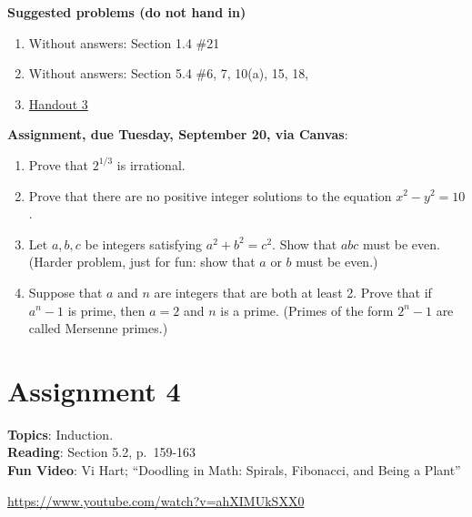 \documentclass[12pt]{article}
\begin{document}
\noindent \textbf{Suggested problems (do not hand in)}

\begin{enumerate}
\item Without answers: Section 1.4 \#21
\item Without answers: Section 5.4 \#6, 7, 10(a), 15, 18,
\item \href{https://www.math.emory.edu/~dzb/teaching/250Fall2021/handouts/250-H03-contradiction.pdf}{Handout 3}
\end{enumerate}

\noindent \textbf{Assignment, due Tuesday, September 20, via Canvas}:
\begin{enumerate}
\item Prove that $2^{1/3}$ is irrational.
\item Prove that there are no positive integer solutions to the equation $x^2 - y^2 = 10$.
\item Let $a, b, c$ be integers satisfying $a^2 + b^2 = c^2$. Show that $abc$ must be even. (Harder problem, just for fun: show that $a$ or $b$ must be even.)
\item Suppose that $a$ and $n$ are integers that are both at least 2. Prove that if $a^n -1$ is prime, then $a = 2$ and $n$ is a prime. (Primes of the form $2^n - 1$ are called Mersenne primes.)
\end{enumerate}



\newpage
\section[4 (due September 27): Induction.]{Assignment 4}

\textbf{Topics}: Induction.
\\

\noindent \textbf{Reading}: Section 5.2, p.~159-163
\\

\noindent \textbf{Fun Video}: Vi Hart; ``Doodling in Math: Spirals, Fibonacci, and Being a Plant''

\noindent \url{https://www.youtube.com/watch?v=ahXIMUkSXX0}
\\ 
\end{document}
